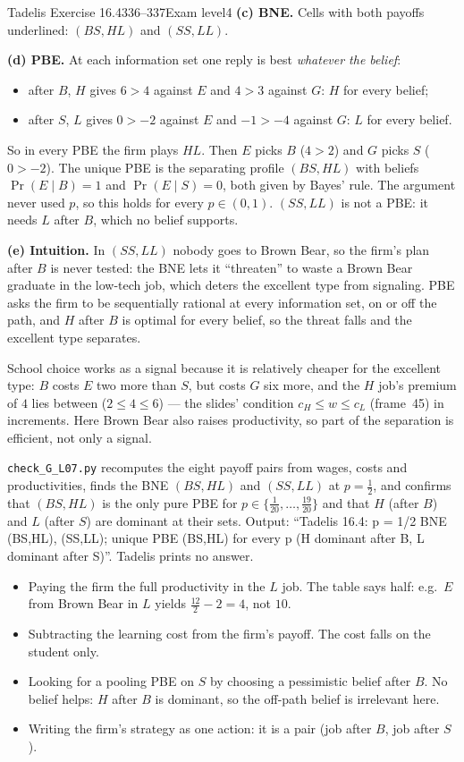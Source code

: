\begin{exsol}{Tadelis Exercise 16.4}{336--337}{Exam level}{4}
\textbf{(c) BNE.} Cells with both payoffs underlined: $(BS, HL)$ and $(SS, LL)$.

\textbf{(d) PBE.} At each information set one reply is best \emph{whatever the belief}:
\begin{itemize}
  \item after $B$, $H$ gives $6 > 4$ against $E$ and $4 > 3$ against $G$: $H$ for every belief;
  \item after $S$, $L$ gives $0 > -2$ against $E$ and $-1 > -4$ against $G$: $L$ for every belief.
\end{itemize}
So in every PBE the firm plays $HL$. Then $E$ picks $B$ ($4 > 2$) and $G$ picks $S$ ($0 > -2$). The unique PBE
is the separating profile $(BS, HL)$ with beliefs $\Pr(E \mid B) = 1$ and $\Pr(E \mid S) = 0$, both given by
Bayes' rule. The argument never used $p$, so this holds for every $p \in (0,1)$. $(SS, LL)$ is not a PBE: it
needs $L$ after $B$, which no belief supports.

\textbf{(e) Intuition.} In $(SS, LL)$ nobody goes to Brown Bear, so the firm's plan after $B$ is never tested: the
BNE lets it ``threaten'' to waste a Brown Bear graduate in the low-tech job, which deters the excellent type from
signaling. PBE asks the firm to be sequentially rational at every information set, on or off the path, and
$H$ after $B$ is optimal for every belief, so the threat falls and the excellent type separates.

\interp School choice works as a signal because it is relatively cheaper for the excellent type: $B$ costs $E$ two
more than $S$, but costs $G$ six more, and the $H$ job's premium of $4$ lies between ($2 \le 4 \le 6$) --- the
slides' condition $c_H \le w \le c_L$ (frame~45) in increments. Here Brown Bear also raises productivity, so
part of the separation is efficient, not only a signal.

\verify \texttt{check\_G\_L07.py} recomputes the eight payoff pairs from wages, costs and productivities, finds
the BNE $(BS, HL)$ and $(SS, LL)$ at $p = \frac12$, and confirms that $(BS, HL)$ is the only pure PBE for
$p \in \{\frac1{20}, \dots, \frac{19}{20}\}$ and that $H$ (after $B$) and $L$ (after $S$) are dominant at their sets.
Output: ``Tadelis 16.4: p = 1/2 BNE (BS,HL), (SS,LL); unique PBE (BS,HL) for every p (H dominant after B, L
dominant after S)''. Tadelis prints no answer.

\mistakes
\begin{itemize}
  \item Paying the firm the full productivity in the $L$ job. The table says half: e.g.\ $E$ from Brown Bear in
  $L$ yields $\frac{12}{2} - 2 = 4$, not $10$.
  \item Subtracting the learning cost from the firm's payoff. The cost falls on the student only.
  \item Looking for a pooling PBE on $S$ by choosing a pessimistic belief after $B$. No belief helps: $H$ after $B$
  is dominant, so the off-path belief is irrelevant here.
  \item Writing the firm's strategy as one action: it is a pair (job after $B$, job after $S$).
\end{itemize}


\end{exsol}
